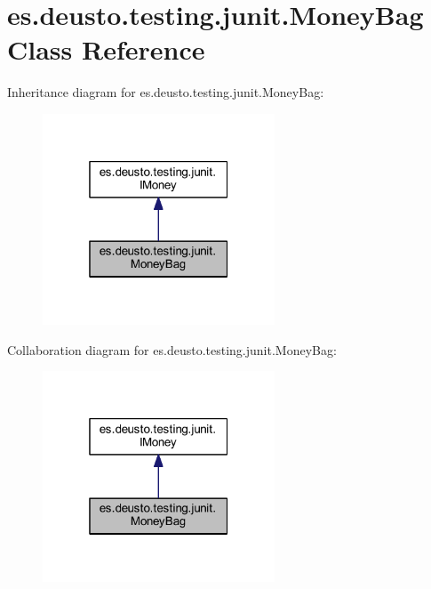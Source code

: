 \hypertarget{classes_1_1deusto_1_1testing_1_1junit_1_1_money_bag}{}\section{es.\+deusto.\+testing.\+junit.\+Money\+Bag Class Reference}
\label{classes_1_1deusto_1_1testing_1_1junit_1_1_money_bag}


Inheritance diagram for es.\+deusto.\+testing.\+junit.\+Money\+Bag\+:
\nopagebreak
\begin{figure}[H]
\begin{center}
\leavevmode
\includegraphics[width=196pt]{classes_1_1deusto_1_1testing_1_1junit_1_1_money_bag__inherit__graph}
\end{center}
\end{figure}


Collaboration diagram for es.\+deusto.\+testing.\+junit.\+Money\+Bag\+:
\nopagebreak
\begin{figure}[H]
\begin{center}
\leavevmode
\includegraphics[width=196pt]{classes_1_1deusto_1_1testing_1_1junit_1_1_money_bag__coll__graph}
\end{center}
\end{figure}
